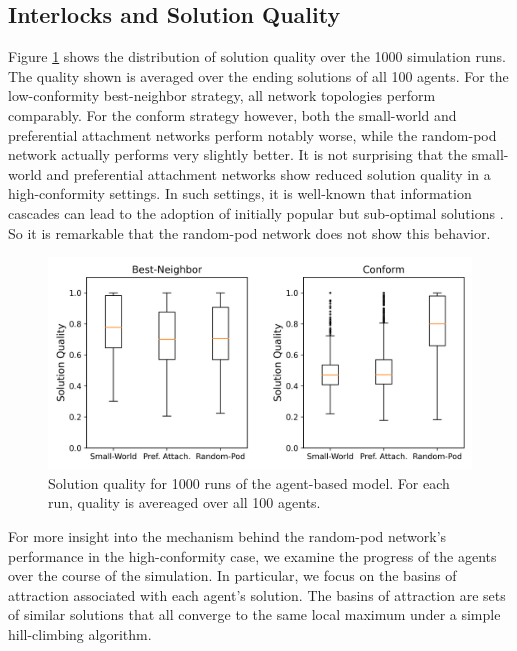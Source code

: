 \documentclass[manuscript,screen,review,acmsmall]{acmart}
\begin{document}
\subsection{Interlocks and Solution Quality}
Figure \ref{fig:quality} shows the distribution of solution quality over
the 1000 simulation runs.
The quality shown is averaged over the ending solutions of all 100 agents.
For the low-conformity best-neighbor strategy,
all network topologies perform comparably.
For the conform strategy however,
both the small-world and preferential attachment networks
perform notably worse, while the random-pod network actually performs
very slightly better.
It is not surprising that the small-world and preferential attachment networks
show reduced solution quality in a high-conformity settings.
In such settings, it is well-known that information cascades can lead to the adoption of initially popular but sub-optimal solutions
\cite{banerjee_simple_1992}.
So it is remarkable that the random-pod network does not show this behavior.

\begin{figure}
\begin{center}
\includegraphics[width=5in]{fig-netdelib-results-net-boxplot.png}
\caption{Solution quality for 1000 runs of the agent-based model. For each run, quality is avereaged over all 100 agents.}
\label{fig:quality}
\end{center}
\end{figure}

For more insight into the mechanism behind the random-pod network's
performance in the high-conformity case,
we examine the progress of the agents over the course of the simulation.
In particular, we focus on the basins of attraction associated with each agent's solution.
The basins of attraction are sets of similar solutions that all converge
to the same local maximum under a simple hill-climbing algorithm.
\end{document}

